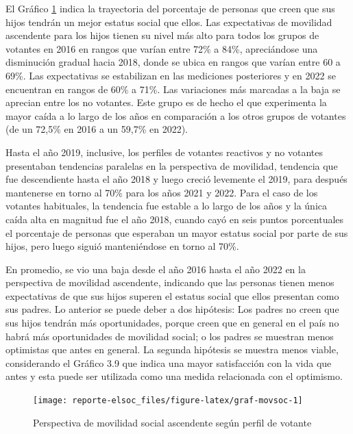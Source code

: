 \documentclass[
  12pt,
]{book}
\begin{document}
El Gráfico \ref{fig:graf-movsoc} indica la trayectoria del porcentaje de personas que creen que sus hijos tendrán un mejor estatus social que ellos. Las expectativas de movilidad ascendente para los hijos tienen su nivel más alto para todos los grupos de votantes en 2016 en rangos que varían entre 72\% a 84\%, apreciándose una disminución gradual hacia 2018, donde se ubica en rangos que varían entre 60 a 69\%. Las expectativas se estabilizan en las mediciones posteriores y en 2022 se encuentran en rangos de 60\% a 71\%. Las variaciones más marcadas a la baja se aprecian entre los no votantes. Este grupo es de hecho el que experimenta la mayor caída a lo largo de los años en comparación a los otros grupos de votantes (de un 72,5\% en 2016 a un 59,7\% en 2022).

Hasta el año 2019, inclusive, los perfiles de votantes reactivos y no votantes presentaban tendencias paralelas en la perspectiva de movilidad, tendencia que fue descendiente hasta el año 2018 y luego creció levemente el 2019, para después mantenerse en torno al 70\% para los años 2021 y 2022. Para el caso de los votantes habituales, la tendencia fue estable a lo largo de los años y la única caída alta en magnitud fue el año 2018, cuando cayó en seis puntos porcentuales el porcentaje de personas que esperaban un mayor estatus social por parte de sus hijos, pero luego siguió manteniéndose en torno al 70\%.

En promedio, se vio una baja desde el año 2016 hasta el año 2022 en la perspectiva de movilidad ascendente, indicando que las personas tienen menos expectativas de que sus hijos superen el estatus social que ellos presentan como sus padres. Lo anterior se puede deber a dos hipótesis: Los padres no creen que sus hijos tendrán más oportunidades, porque creen que en general en el país no habrá más oportunidades de movilidad social; o los padres se muestran menos optimistas que antes en general. La segunda hipótesis se muestra menos viable, considerando el Gráfico 3.9 que indica una mayor satisfacción con la vida que antes y esta puede ser utilizada como una medida relacionada con el optimismo.

\begin{figure}

{\centering \texttt{[image: reporte-elsoc\_files/figure-latex/graf-movsoc-1]} 

}

\caption{Perspectiva de movilidad social ascendente según perfil de votante}\label{fig:graf-movsoc}
\end{figure}
\end{document}
